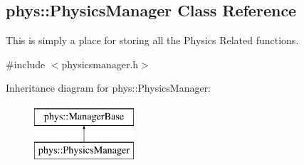 \hypertarget{classphys_1_1PhysicsManager}{
\subsection{phys::PhysicsManager Class Reference}
\label{classphys_1_1PhysicsManager}
}


This is simply a place for storing all the Physics Related functions.  




{\ttfamily \#include $<$physicsmanager.h$>$}

Inheritance diagram for phys::PhysicsManager:\begin{figure}[H]
\begin{center}
\leavevmode
\includegraphics[height=2.000000cm]{classphys_1_1PhysicsManager}
\end{center}
\end{figure}
